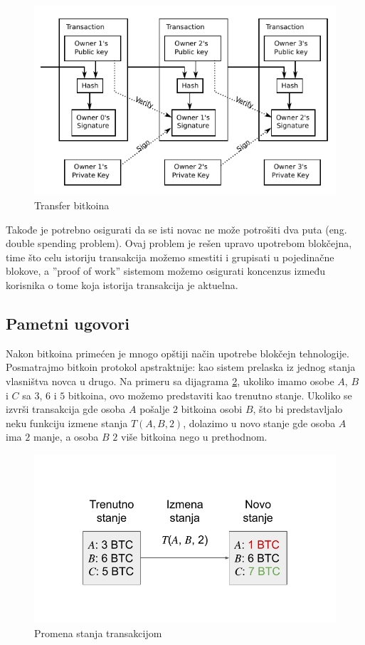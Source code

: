 \documentclass[a4paper]{article}
\begin{document}
\begin{figure}[H]
    \centering
        \includegraphics[scale=0.8]{Bitcoin_Transaction_Visual.pdf}
    \caption{Transfer bitkoina}
    \label{fig:btc_transfer}
\end{figure}

Takođe je potrebno osigurati da se isti novac ne može potrošiti dva puta (eng. double spending problem).
Ovaj problem je rešen upravo upotrebom blokčejna, time što celu istoriju transakcija možemo smestiti i grupisati u pojedinačne blokove, a
''proof of work'' sistemom možemo osigurati koncenzus između korisnika o tome koja istorija transakcija je aktuelna. 

\subsection{Pametni ugovori}
Nakon bitkoina primećen je mnogo opštiji način upotrebe blokčejn tehnologije.
Posmatrajmo bitkoin protokol apstraktnije: kao sistem prelaska iz jednog stanja vlasništva novca u drugo.
Na primeru sa dijagrama \ref{fig:state_diagram}, ukoliko imamo osobe $A$, $B$ i $C$ sa $3$, $6$ i $5$ bitkoina, ovo možemo predstaviti kao trenutno stanje.
Ukoliko se izvrši transakcija gde osoba $A$ pošalje $2$ bitkoina osobi $B$, što bi predstavljalo neku funkciju izmene stanja $T(A, B, 2)$, dolazimo u novo stanje gde osoba $A$ ima $2$ manje, a osoba $B$ $2$ više bitkoina nego u prethodnom.

\begin{figure}[H]
    \centering
        \includegraphics[scale=0.6]{State_Transition.pdf}
    \caption{Promena stanja transakcijom}
    \label{fig:state_diagram}
\end{figure}
\end{document}
